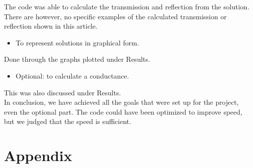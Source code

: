 \documentclass[a4paper]{article}
\begin{document}
The code was able to calculate the transmission and reflection from the solution. There are however, no specific examples of the calculated transmission or reflection shown in this article.


\begin{itemize}
\item To represent solutions in graphical form.
\end{itemize}
Done through the graphs plotted under Results.
\begin{itemize}
\item Optional: to calculate a conductance.
\end{itemize}
This was also discussed under Results.
\\
In conclusion,  we have achieved all the goals that were set up for the project, even the optional part.  The code could have been optimized to improve speed, but we judged that the speed is sufficient.

\newpage



\newpage
\part*{Appendix}


\end{document}
